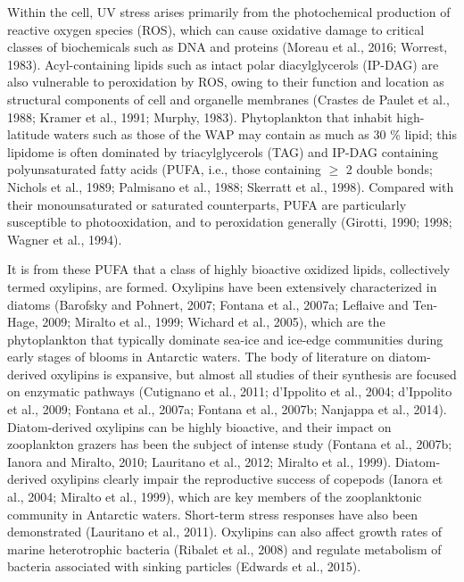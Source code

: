 Within the cell, UV stress arises primarily from the photochemical production of reactive oxygen species (ROS), which can cause oxidative damage to critical classes of biochemicals such as DNA and proteins (Moreau et al., 2016; Worrest, 1983). Acyl-containing lipids such as intact polar diacylglycerols (IP-DAG) are also vulnerable to peroxidation by ROS, owing to their function and location as structural components of cell and organelle membranes (Crastes de Paulet et al., 1988; Kramer et al., 1991; Murphy, 1983). Phytoplankton that inhabit high-latitude waters such as those of the WAP may contain as much as 30 \% lipid; this lipidome is often dominated by triacylglycerols (TAG) and IP-DAG containing polyunsaturated fatty acids (PUFA, i.e., those containing $\geq$ 2 double bonds; Nichols et al., 1989; Palmisano et al., 1988; Skerratt et al., 1998). Compared with their monounsaturated or saturated counterparts, PUFA are particularly susceptible to photooxidation, and to peroxidation generally (Girotti, 1990; 1998; Wagner et al., 1994).

It is from these PUFA that a class of highly bioactive oxidized lipids, collectively termed oxylipins, are formed. Oxylipins have been extensively characterized in diatoms (Barofsky and Pohnert, 2007; Fontana et al., 2007a; Leflaive and Ten-Hage, 2009; Miralto et al., 1999; Wichard et al., 2005), which are the phytoplankton that typically dominate sea-ice and ice-edge communities during early stages of blooms in Antarctic waters. The body of literature on diatom-derived oxylipins is expansive, but almost all studies of their synthesis are focused on enzymatic pathways (Cutignano et al., 2011; d'Ippolito et al., 2004; d'Ippolito et al., 2009; Fontana et al., 2007a; Fontana et al., 2007b; Nanjappa et al., 2014). Diatom-derived oxylipins can be highly bioactive, and their impact on zooplankton grazers has been the subject of intense study (Fontana et al., 2007b; Ianora and Miralto, 2010; Lauritano et al., 2012; Miralto et al., 1999). Diatom-derived oxylipins clearly impair the reproductive success of copepods (Ianora et al., 2004; Miralto et al., 1999), which are key members of the zooplanktonic community in Antarctic waters. Short-term stress responses have also been demonstrated (Lauritano et al., 2011). Oxylipins can also affect growth rates of marine heterotrophic bacteria (Ribalet et al., 2008) and regulate metabolism of bacteria associated with sinking particles (Edwards et al., 2015).

